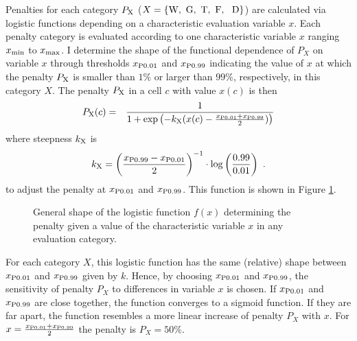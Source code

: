 Penalties for each category $P_{\rm X}$ ($X=\{\text{W,\, G,\, T,\, F, \, D}\}$) are calculated via logistic functions depending on a characteristic evaluation variable $x$.
Each penalty category is evaluated according to one characteristic variable $x$ ranging $x_{\rm min}$ to $x_{\rm max}$.
I determine the shape of the functional dependence of $P_X$ on variable $x$ through thresholds $x_{\rm P0.01}$ and $x_{\rm P0.99}$ indicating the value of $x$ at which the penalty $P_{\rm X}$ is smaller than $1\%$ or larger than $99\%$, respectively, in this category $X$.
The penalty $P_{\rm X}$ in a cell $c$ with value $x(c)$ is then
\begin{eqnarray}\label{eq:P_X(c)}
	P_{\rm X}(c) & = & \frac{1}{1+\exp\left( - k_{\rm X} (x(c)-\frac{x_{\rm P0.01}+x_{\rm P0.99}}{2}) \right)} %
\end{eqnarray}
where steepness $k_{\rm X}$ is 
\begin{equation}\label{eq:k}
k_{\rm X} = \left(\frac{x_{\rm P0.99}-{x_{\rm P0.01}}}{2}\right)^{-1} \cdot \log\left(\frac{0.99}{0.01}\right) \ .
\end{equation}
to adjust the penalty at $x_{\rm P0.01}$ and $x_{\rm P0.99}$.
This function is shown in Figure \ref{fig:logF}.
\begin{figure}
	\centering
	\caption{General shape of the logistic function $f(x)$ determining the penalty given a value of the characteristic variable $x$ in any evaluation category.}
	\label{fig:logF}
\end{figure}
For each category $X$, this logistic function has the same (relative) shape between $x_{\rm P0.01}$ and $x_{\rm P0.99}$ given by $k$. 
Hence, by choosing $x_{\rm P0.01}$ and $x_{\rm P0.99}$, the sensitivity of penalty $P_X$ to differences in variable $x$ is chosen. 
If $x_{\rm P0.01}$ and $x_{\rm P0.99}$ are close together, the function converges to a sigmoid function. 
If they are far apart, the function resembles a more linear increase of penalty $P_X$ with $x$.
For $x=\frac{x_{\rm P0.01} + x_{\rm P0.99}}{2}$ the penalty is $P_X = 50\%$.

